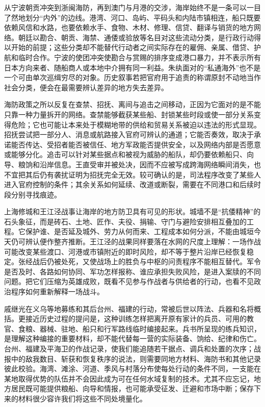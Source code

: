 从宁波朝贡冲突到浙闽海防，再到澳门与月港的交涉，海岸始终不是一条可以一目了然地划分“内外”的边线。港湾、河口、岛屿、平码头和内陆市镇相连，船只既要依赖风信和水路，也要依赖水手、食物、木材、修理、信贷、翻译与销货的地方网络。朝廷以勘合、朝贡、海禁、通倭或验放等名目对这些流动分类，是行政行动得以开始的前提；这些分类却不能替代行动者之间实际存在的雇佣、亲属、借贷、护航和临时合作。宁波的使团冲突使勘合与赏赐的排序变成港口暴力，并不表示所有日本方向来者、随船商人或本地中介拥有同一利益。朱纨面对的“私通海外”也不是一个可由单次巡缉穷尽的对象。历史叙事若把官府用于追责的称谓原封不动地当作社会分类，便会在最需要辨认差异的地方失去差异。

海防政策之所以反复在查禁、招抚、离间与追击之间移动，正因为它面对的是不能只靠一种力量拆开的网络。查禁能够截获某些船、封锁某些时段或使一部分关系变得危险；它也可能让本来处于模糊地带的供给和贸易关系被迫以违法的形式显现。招抚尝试把一部分人、消息或航路接入官府可辨认的通道；它能否奏效，取决于承诺能否传达、受招者能否被信任、地方军政能否提供安全，以及网络内部是否愿意或能够分化。追击可以针对某些据点和被视为威胁的船队，却仍要依赖船只、向导、粮饷和沿岸信息。王直受审并被处决，因而不应被写成跨海网络瞬间消失，也不宜把其后仍有袭扰证明为招抚完全无效。较可确认的是，司法程序改变了某些人进入官府控制的条件；其余关系如何延续、改道或断裂，需要在不同港口和后续时段分别寻找痕迹。

上海修城和王江泾战事让海岸的地方防卫具有可见的形状。城墙不是“抗倭精神”的石头象征，而是砖石、土地、匠作、夫役、捐输、守门与避险安排相互叠加的工程。它保护谁、是否延及城外、劳力从何而来、工程成本如何分派，不能由城垣今天仍可辨认便作整齐推断。王江泾的战果同样要落在水网的尺度上理解：一场作战可能改变某些渡口、河港或市镇附近的即时风险，却不等于整片沿岸已经恢复稳定。张经战后仍被处死，又使战场上的胜负与中枢的问责程序不能相互替代。军令是否及时、各路如何协同、军功怎样报称、谁应承担失败风险，是进入案牍的不同问题。把它们压缩为英雄成败，既看不见参与作战者与供给者的行动，也看不见政治程序如何重新解释一场战斗。

戚继光在义乌等地募练和其后台州、福建的行动，常被后世以阵法、兵器和名将概括。更接近历史过程的提问是，这种训练怎样把离开原有家计的兵员、可用的教官、食粮、器械、驻地、船只和行军路线临时编接起来。兵书所呈现的练兵知识，是理解这种编接的重要材料，却不能代替每一营的实际装备、饷给、纪律和伤亡。台州、福建及平海卫的作战记录，使我们能追随若干据点、调兵和处置的次序；战报中的敌我数目、斩获和恢复秩序的说法，则需要同地方材料、海防书和其他记录彼此校验。海湾、滩涂、河道、季风与村落分布使每处行动的条件不同，一支能在某地取得优势的队伍并不会因此成为可在任何水域复制的技术。尤其不应忘记，地方居民既可能提供粮船、向导和情报，也可能承受征发、迁避和市场中断；保存下来的材料很少容许我们将这些不同处境量化。

